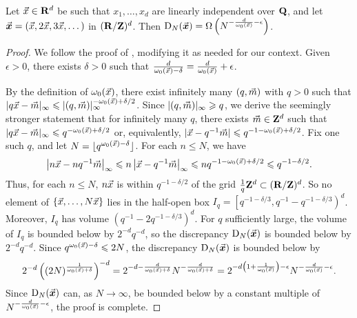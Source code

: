 \begin{theorem}\label{thm:disc-lower-bound}
Let $\vec{x}\in \mathbf{R}^d$ be such that $x_1,\dots,x_d$ are linearly independent over 
$\mathbf{Q}$, and let $\vec{\boldsymbol x}=(\vec{x},2\vec{x},3\vec{x},\dots)$ in $(\mathbf{R}/\mathbf{Z})^d$. Then 
$\operatorname{D}_N(\vec{\boldsymbol x}) = \Omega\left(N^{-\frac{d}{\omega_0(\vec{x})}-\epsilon} \right)$. 
\end{theorem}
\begin{proof}
We follow the proof of \cite[Ch.~2, Th.~3.3]{kuipers-niederreiter-1974}, 
modifying it as needed for our context. Given $\epsilon>0$, there exists 
$\delta>0$ such that 
$\frac{d}{\omega_0(\vec{x})-\delta} = \frac{d}{\omega_0(\vec{x})} + \epsilon$. 

By the definition of $\omega_0(\vec{x})$, there exist infinitely many 
$(q,\vec{m})$ with $q>0$ such that 
$|q \vec{x} - \vec{m}|_\infty \leqslant |(q,\vec{m})|_\infty^{-\omega_0(\vec{x})+\delta/2}$. 
Since $|(q,\vec{m})|_\infty \geqslant q$, we derive the seemingly stronger 
statement that for infinitely many $q$, there exists 
$\vec{m}\in \mathbf{Z}^d$ such that 
$|q \vec{x}-\vec{m}|_\infty \leqslant q^{-\omega_0(\vec{x})+\delta/2}$ or, equivalently, 
$|\vec{x}-q^{-1}\vec{m}| \leqslant q^{-1-\omega_0(\vec{x})+\delta/2}$. Fix one such $q$, 
and let $N=\lfloor q^{\omega_0(\vec{x})-\delta}\rfloor$. For each $n\leqslant N$, 
we have 
\[
	\left|n \vec{x} - n q^{-1} \vec{m}\right|_\infty 
		\leqslant n \left|\vec{x} - q^{-1} \vec{m}\right|_\infty
		\leqslant n q^{-1-\omega_0(\vec{x})+\delta/2}
		\leqslant q^{-1-\delta/2}. 
\]
Thus, for each $n\leqslant N$, $n \vec{x}$ is within $q^{-1-\delta/2}$ of the 
grid $\frac 1 q \mathbf{Z}^d\subset (\mathbf{R}/\mathbf{Z})^d$. So no element of 
$\{\vec{x},\dots,N \vec{x}\}$ lies in the half-open box 
$I_q = \left[ q^{-1 - \delta / 3}, q^{-1} - q^{-1 - \delta / 3}\right)^d$. 
Moreover, $I_q$ has volume $\left(q^{-1} - 2q^{-1 - \delta / 3}\right)^d$. 
For $q$ sufficiently large, the volume of $I_q$ is bounded below by 
$2^{-d} q^{-d}$, so the discrepancy $\operatorname{D}_N(\vec{\boldsymbol x})$ is 
bounded below by $2^{-d} q^{-d}$. Since $q^{\omega_0(\vec{x})-\delta} \leqslant 2 N$, 
the discrepancy $\operatorname{D}_N(\vec{\boldsymbol x})$ is bounded below by 
\[
	2^{-d} \left( (2 N)^{\frac{1}{\omega_0(\vec{x})+\delta}}\right)^{-d} 
		= 2^{-d-\frac{d}{\omega_0(\vec{x})+\delta}} N^{-\frac{d}{\omega_0(\vec{x})+\delta}}
		= 2^{-d\left(1+\frac{1}{\omega_0(\vec{x})}\right)-\epsilon} N^{-\frac{d}{\omega_0(\vec{x})}-\epsilon} .
\]
Since $\operatorname{D}_N(\vec{\boldsymbol x})$ can, as $N\to \infty$, be bounded below by a constant 
multiple of $N^{-\frac{d}{\omega_0(\vec{x})}-\epsilon}$, the proof is complete.
\end{proof}






